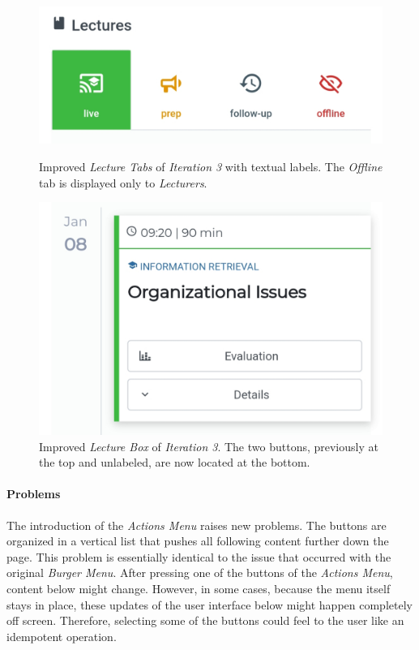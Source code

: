\begin{figure}
	\centering
	\begin{minipage}[t]{.5\textwidth}
		\centering
		\includegraphics[width=0.95\linewidth]{screenshots/redesign/lecture_tab_labels.jpg}
		\captionsetup{width=.8\linewidth}
		\captionsetup{format=plain}
		\caption{Improved \emph{Lecture Tabs} of \emph{Iteration 3} with textual labels. The \emph{Offline} tab is displayed only to \emph{Lecturers}.}
		\label{fig:main_view_tab_labels}
	\end{minipage}%
	\begin{minipage}[t]{.5\textwidth}
		\centering
		\includegraphics[width=0.95\linewidth]{screenshots/redesign/main_view_it3_lecture_box.jpg}
		\captionsetup{width=.8\linewidth}
		\captionsetup{format=plain}
		\caption{Improved \emph{Lecture Box} of \emph{Iteration 3}. The two buttons, previously at the top and unlabeled, are now located at the bottom.}
		\label{fig:main_view_lecture_box_buttons}
	\end{minipage}
\end{figure}
\paragraph{Problems}
The introduction of the \emph{Actions Menu} raises new problems. The buttons are organized in a vertical list that pushes all following content further down the page. This problem is essentially identical to the issue that occurred with the original \emph{Burger Menu}. After pressing one of the buttons of the \emph{Actions Menu}, content below might change. However, in some cases, because the menu itself stays in place, these updates of the user interface below might happen completely off screen. Therefore, selecting some of the buttons could feel to the user like an idempotent operation.

